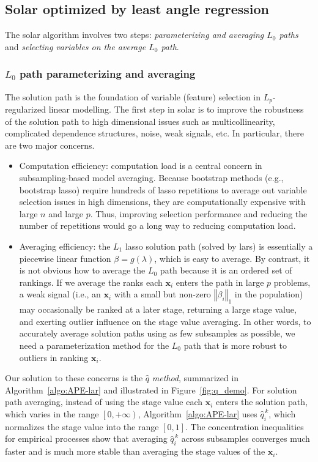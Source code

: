 \documentclass[11pt,review,authoryear]{elsarticle}
\begin{document}
\subsection{Solar optimized by least angle regression}

The solar algorithm involves two steps: \emph{parameterizing and averaging $L_0$ paths} and \emph{selecting variables on the average $L_0$ path}.

\subsubsection{$L_0$ path parameterizing and averaging}

The solution path is the foundation of variable (feature) selection in $L_p$-regularized linear modelling. The first step in solar is to improve the robustness of the solution path to high dimensional issues such as multicollinearity, complicated dependence structures, noise, weak signals, etc. In particular, there are two major concerns.
\begin{itemize}
  \item Computation efficiency: computation load is a central concern in subsampling-based model averaging. Because bootstrap methods (e.g., bootstrap lasso) require hundreds of lasso repetitions to average out variable selection issues in high dimensions, they are computationally expensive with large $n$ and large $p$. Thus, improving selection performance and reducing the number of repetitions would go a long way to reducing computation load.
  \item Averaging efficiency: the $L_1$ lasso solution path (solved by lars) is essentially a piecewise linear function $\beta = g(\lambda)$, which is easy to average. By contrast, it is not obvious how to average the $L_0$ path because it is an ordered set of rankings. If we average the ranks each $\mathbf{x}_i$ enters the path in large $p$ problems, a weak signal (i.e., an $\mathbf{x}_i$ with a small but non-zero $\left\Vert \beta_i \right\Vert_1$ in the population) may occasionally be ranked at a later stage, returning a large stage value, and exerting outlier influence on the stage value averaging. In other words, to accurately average solution paths using as few subsamples as possible, we need a parameterization method for the $L_0$ path that is more robust to outliers in ranking $\mathbf{x}_i$.
\end{itemize}

\noindent
Our solution to these concerns is the $\widehat{q}$ \emph{method}, summarized in Algorithm~\ref{algo:APE-lar} and illustrated in Figure~\ref{fig:q_demo}. For solution path averaging, instead of using the stage value each $\mathbf{x}_i$ enters the solution path, which varies in the range $\left[0, +\infty \right)$, Algorithm~\ref{algo:APE-lar} uses $\widehat{q}^{\,k}_i$, which normalizes the stage value into the range $\left[ 0,1 \right]$. The concentration inequalities for empirical processes show that averaging $\widehat{q}^{\,k}_i$ across subsamples converges much faster and is much more stable than averaging the stage values of the $\mathbf{x}_i$.
\end{document}
